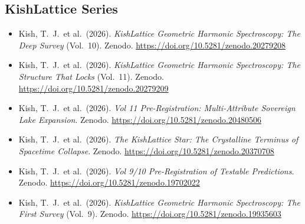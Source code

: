 \documentclass[11pt, letterpaper, openany]{book}
\begin{document}
\begin{newworld}
\section*{KishLattice Series}
\begin{itemize}
    \item Kish, T.~J.\ et al.\ (2026). \textit{KishLattice Geometric
    Harmonic Spectroscopy: The Deep Survey} (Vol.~10). Zenodo.
    \url{https://doi.org/10.5281/zenodo.20279208}
	\item Kish, T.~J.\ et al.\ (2026). \textit{KishLattice Geometric
    Harmonic Spectroscopy: The Structure That Locks} (Vol.~11). Zenodo.
    \url{https://doi.org/10.5281/zenodo.20279209}
    \item Kish, T.~J.\ et al.\ (2026). \textit{Vol 11 Pre-Registration:
    Multi-Attribute Sovereign Lake Expansion}. Zenodo.
    \url{https://doi.org/10.5281/zenodo.20480506}
    \item Kish, T.~J.\ et al.\ (2026). \textit{The KishLattice Star:
    The Crystalline Terminus of Spacetime Collapse}. Zenodo.
    \url{https://doi.org/10.5281/zenodo.20370708}
    \item Kish, T.~J.\ et al.\ (2026). \textit{Vol 9/10 Pre-Registration
    of Testable Predictions}. Zenodo.
    \url{https://doi.org/10.5281/zenodo.19702022}
    \item Kish, T.~J.\ et al.\ (2026). \textit{KishLattice Geometric
    Harmonic Spectroscopy: The First Survey} (Vol.~9). Zenodo.
    \url{https://doi.org/10.5281/zenodo.19935603}
\end{itemize}


\end{newworld}
\end{document}
